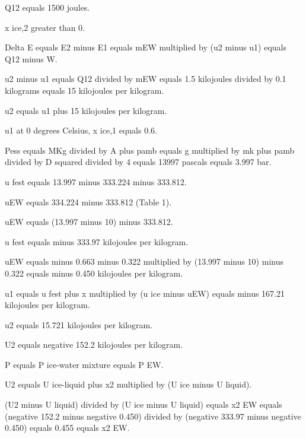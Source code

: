 Q12 equals 1500 joules.  

x ice,2 greater than 0.  

Delta E equals E2 minus E1 equals mEW multiplied by (u2 minus u1) equals Q12 minus W.  

u2 minus u1 equals Q12 divided by mEW equals 1.5 kilojoules divided by 0.1 kilograms equals 15 kilojoules per kilogram.  

u2 equals u1 plus 15 kilojoules per kilogram.  

u1 at 0 degrees Celsius, x ice,1 equals 0.6.  

Pess equals MKg divided by A plus pamb equals g multiplied by mk plus pamb divided by D squared divided by 4 equals 13997 pascals equals 3.997 bar.  

u fest equals 13.997 minus 333.224 minus 333.812.  

uEW equals 334.224 minus 333.812 (Table 1).  

uEW equals (13.997 minus 10) minus 333.812.  

u fest equals minus 333.97 kilojoules per kilogram.  

uEW equals minus 0.663 minus 0.322 multiplied by (13.997 minus 10) minus 0.322 equals minus 0.450 kilojoules per kilogram.  

u1 equals u fest plus x multiplied by (u ice minus uEW) equals minus 167.21 kilojoules per kilogram.  

u2 equals 15.721 kilojoules per kilogram.

U2 equals negative 152.2 kilojoules per kilogram.  

P equals P ice-water mixture equals P EW.  

U2 equals U ice-liquid plus x2 multiplied by (U ice minus U liquid).  

(U2 minus U liquid) divided by (U ice minus U liquid) equals x2 EW equals (negative 152.2 minus negative 0.450) divided by (negative 333.97 minus negative 0.450) equals 0.455 equals x2 EW.